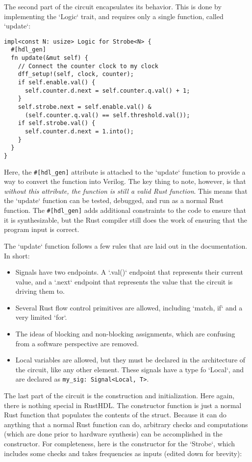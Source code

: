\documentclass[conference]{IEEEtran}
\begin{document}
The second part of the circuit encapsulates its behavior.  This is done by implementing the `Logic` trait,
and requires only a single function, called `update`:

\begin{verbatim}
impl<const N: usize> Logic for Strobe<N> {
  #[hdl_gen]
  fn update(&mut self) {
    // Connect the counter clock to my clock
    dff_setup!(self, clock, counter);
    if self.enable.val() {
      self.counter.d.next = self.counter.q.val() + 1;
    }
    self.strobe.next = self.enable.val() & 
      (self.counter.q.val() == self.threshold.val());
    if self.strobe.val() {
      self.counter.d.next = 1.into();
    }
  }
}
\end{verbatim}

Here, the \verb|#[hdl_gen]| attribute is attached to the `update` function to provide a way to convert the function
into Verilog.  The key thing to note, however, is that \emph{without this attribute, the function is still a valid Rust function}.
This means that the `update` function can be tested, debugged, and run as a normal Rust function.  The \verb|#[hdl_gen]| adds
additional constraints to the code to ensure that it is synthesizable, but the Rust compiler still does the work of ensuring that the 
program input is correct.

The `update` function follows a few rules that are laid out in the documentation.  In short:
\begin{itemize}
  \item Signals have two endpoints.  A `.val()` endpoint that represents their current value, and a `.next` endpoint that represents
    the value that the circuit is driving them to.
  \item Several Rust flow control primitives are allowed, including `match, if` and a very limited `for`.  
  \item The ideas of blocking and non-blocking assignments, which are confusing from a software perspective are removed.  
  \item Local variables are allowed, but they must be declared in the architecture of the circuit, like any other element.
  These signals have a type fo `Local`, and are declared as \verb|my_sig: Signal<Local, T>|.
\end{itemize}

The last part of the circuit is the construction and initialization.  Here again, there is nothing special in RustHDL.  The 
constructor function is just a normal Rust function that populates the contents of the struct.  Because it can do anything
that a normal Rust function can do, arbitrary checks and computations (which are done prior to hardware synthesis) can be 
accomplished in the constructor.  For completeness, here is the constructor for the `Strobe`, which includes some checks 
and takes frequencies as inputs (edited down for brevity):
\end{document}
